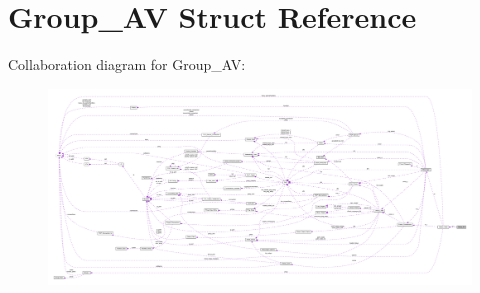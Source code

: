 \hypertarget{struct_group___a_v}{\section{Group\+\_\+\+A\+V Struct Reference}
\label{struct_group___a_v}
}


Collaboration diagram for Group\+\_\+\+A\+V\+:\nopagebreak
\begin{figure}[H]
\begin{center}
\leavevmode
\includegraphics[width=350pt]{struct_group___a_v__coll__graph}
\end{center}
\end{figure}
